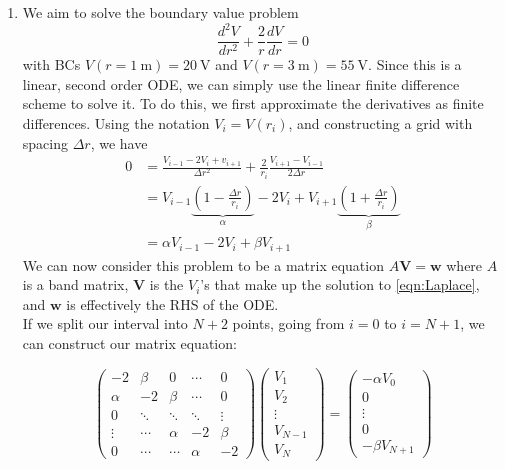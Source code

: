 \documentclass[11pt]{article}
\newcommand{\mb}[1]{\mathbf{#1}}
\begin{document}
\begin{enumerate}
\begin{enumerate}
    \end{enumerate}

    \item We aim to solve the boundary value problem
    \begin{equation}
        \frac{d^2V}{dr^2}+\frac{2}{r}\frac{dV}{dr}=0
        \label{eqn:Laplace}
    \end{equation}
    with BCs $V(r=\SI{1}{\metre})=\SI{20}{\volt}$ and $V(r=\SI{3}{\metre})=\SI{55}{\volt}$. Since this is a linear, second order ODE, we can simply use the linear finite difference scheme to solve it. To do this, we first approximate the derivatives as finite differences. Using the notation $V_i=V(r_i)$, and constructing a grid with spacing $\Delta r$, we have
    \begin{align*}
        0 &= \frac{V_{i-1} - 2V_i + v_{i+1}}{\Delta r^2} + \frac{2}{r_i}\frac{V_{i+1} - V_{i-1}}{2\Delta r} \\
        &= V_{i-1}\underbrace{\left(1-\frac{\Delta r}{r_i}\right)}_\alpha -2V_i+V_{i+1}\underbrace{\left(1+\frac{\Delta r}{r_i}\right)}_\beta \\
        &= \alpha V_{i-1} -2V_i +\beta V_{i+1}
    \end{align*}
    We can now consider this problem to be a matrix equation $A \mb{V}=\mb{w}$ where $A$ is a band matrix, $\mb{V}$ is the $V_i$'s that make up the solution to \cref{eqn:Laplace}, and $\mb{w}$ is effectively the RHS of the ODE. \\
    If we split our interval into $N+2$ points, going from $i=0$ to $i=N+1$, we can construct our matrix equation:

    \begin{equation}
        \begin{pmatrix}
            -2 & \beta & 0 & \cdots & 0 \\
            \alpha & -2 & \beta & \cdots & 0 \\
            0 & \ddots & \ddots & \ddots & \vdots \\
            \vdots & \cdots & \alpha & -2 & \beta \\
            0 & \cdots & \cdots & \alpha & -2 
        \end{pmatrix}
        \begin{pmatrix}
            V_1 \\
            V_2 \\
            \vdots \\
            V_{N-1} \\
            V_N
        \end{pmatrix}
        =
        \begin{pmatrix}
            -\alpha V_0 \\
            0 \\
            \vdots \\
            0 \\
            -\beta V_{N+1}
        \end{pmatrix}
        \label{eqn:matrixEqn}
    \end{equation}


\end{enumerate}
\end{document}
